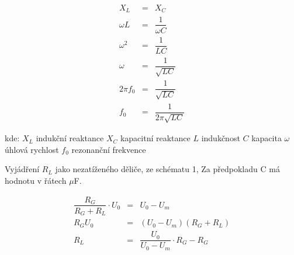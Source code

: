     \begin{eqnarray}
      X_L &=& X_C \nonumber\\
      \omega L &=& \dfrac{1}{\omega C} \nonumber\\
      \omega^2 &=& \dfrac{1}{LC} \nonumber\\
      \omega &=& \dfrac{1}{\sqrt{LC}} \nonumber\\
      2\pi f_0 &=& \dfrac{1}{\sqrt{LC}} \nonumber\\
      f_0 &=& \dfrac{1}{2\pi\sqrt{LC}}   
    \end{eqnarray}
    
    \hspace*{2cm}kde:\newline        
    \hspace*{4cm}$X_L$ \dotfill indukční reaktance\hspace*{4cm}\newline
    \hspace*{4cm}$X_C$ \dotfill kapacitní reaktance\hspace*{4cm}\newline
    \hspace*{4cm}$L$ \dotfill indukčnost\hspace*{4cm}\newline
    \hspace*{4cm}$C$ \dotfill kapacita\hspace*{4cm}\newline
    \hspace*{4cm}$\omega$ \dotfill úhlová rychlost\hspace*{4cm}\newline
    \hspace*{4cm}$f_0$ \dotfill rezonanční frekvence\hspace*{4cm}\newline
    
  Vyjádření $R_L$ jako nezatíženého děliče, ze schématu 1, Za předpokladu C má hodnotu v řátech $\mu$F.
  
  \begin{eqnarray}
    \dfrac{R_G}{R_G+R_L} \cdot U_0 &=& U_0 - U_m \nonumber\\
    R_GU_0 &=& (U_0-U_m)(R_G+R_L) \nonumber\\
    R_L &=& \dfrac{U_0}{U_0-U_m} \cdot R_G - R_G
  \end{eqnarray}
  
